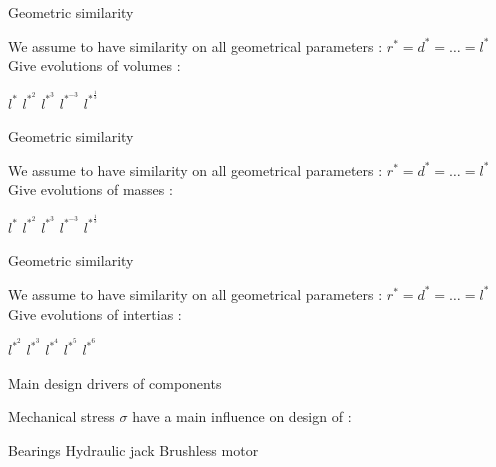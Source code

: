 \documentclass{webquiz}
\begin{document}
   \begin{question} 
          \begin{center}
	\large{Geometric similarity}
\end{center}
    We assume to have similarity on all geometrical parameters :  $r^* = d^* = …=  l^*$ \\
    \newline
	Give evolutions of volumes : 
     \begin{choice}
      \incorrect  $ l^*$
      \incorrect  $ l^{*^2}$ 
      \incorrect  $ l^{*^3}$ 
      \incorrect $ l^{*^{-3}}$ 
      \correct  $ l^{*^{\frac{1}{3}}}$ 
     \end{choice} 
   \end{question}
   
   \begin{question} 
          \begin{center}
	\large{Geometric similarity}
\end{center}
     We assume to have similarity on all geometrical parameters :  $r^* = d^* = …=  l^*$ \\
    \newline
	Give evolutions of masses : 
     \begin{choice}
      \incorrect  $ l^*$
      \incorrect  $ l^{*^2}$ 
      \incorrect  $ l^{*^3}$ 
      \incorrect $ l^{*^{-3}}$ 
      \correct  $ l^{*^{\frac{1}{3}}}$ 
     \end{choice} 
   \end{question}
     \begin{question} 
         \begin{center}
	\large{Geometric similarity}
\end{center}
   We assume to have similarity on all geometrical parameters :  $r^* = d^* = …=  l^*$ \\
    \newline
	Give evolutions of intertias : 
     \begin{choice}
      \incorrect  $ l^{*^2}$ 
      \incorrect  $ l^{*^3}$ 
         \incorrect  $ l^{*^4}$
      \incorrect $ l^{*^{5}}$ 
      \correct  $ l^{*^6}$ 
     \end{choice} 
   \end{question}
   
   \begin{question} 
       \begin{center}
	\large{Main design drivers of components}
\end{center}
 Mechanical stress $\sigma$ have a main influence on design of : \\
     \begin{choice}
      \incorrect  Bearings
      \incorrect  Hydraulic jack
         \correct  Brushless motor
     \end{choice} 
   \end{question}
   
\end{document}
